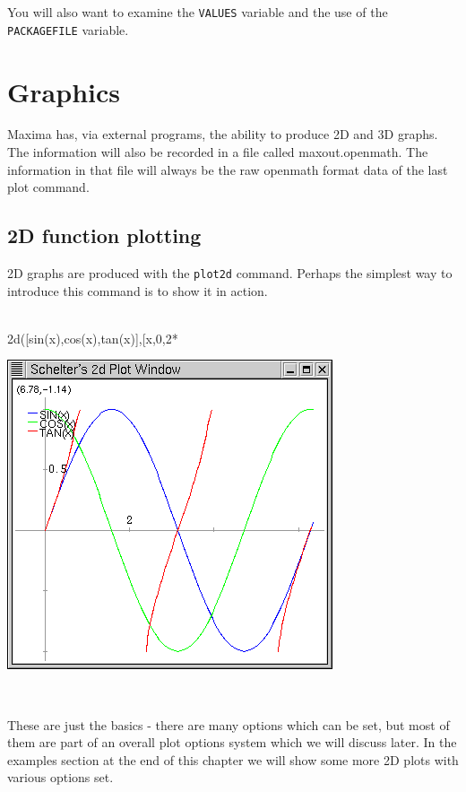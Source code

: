 You will also want to examine the \texttt{VALUES} variable and the use of 
the \texttt{PACKAGEFILE} variable.

\newpage

\section{Graphics}

Maxima has, via external programs, the ability to produce 2D and 3D graphs.  The information will also be recorded in a file called maxout.openmath.  The information in that file will always be the raw openmath format data of the last plot command.

\subsection{2D function plotting}

2D graphs are produced with the \texttt{plot2d} command.  Perhaps the simplest way to introduce this
command is to show it in action.

~\\
\verb@plot2d([sin(x),cos(x),tan(x)],[x,0,2*%Pi],[y,-1,1]);@\\
~\\
{\centering \includegraphics{images/2dplotwindow} \par }

~

These are just the basics - there are many options which can be set, but most of them are part of an overall plot options system which we will discuss later.  In the examples section at the end of this chapter we will show some more 2D plots with various options set.

